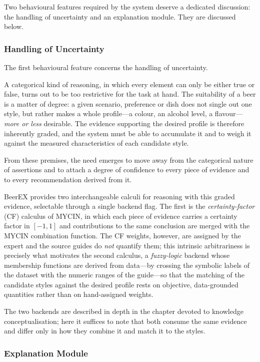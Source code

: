 Two behavioural features required by the system deserve a dedicated discussion:
the handling of uncertainty and an explanation module. They are discussed below.


\subsubsection{Handling of Uncertainty}

The first behavioural feature concerns the handling of uncertainty.

A categorical kind of reasoning, in which every element can only be either true
or false, turns out to be too restrictive for the task at hand. The suitability
of a beer is a matter of degree: a given scenario, preference or dish does not
single out one style, but rather makes a whole profile---a colour, an alcohol
level, a flavour---\emph{more or less} desirable. The evidence supporting the
desired profile is therefore inherently graded, and the system must be able to
accumulate it and to weigh it against the measured characteristics of each
candidate style.

From these premises, the need emerges to move away from the categorical nature of
assertions and to attach a degree of confidence to every piece of evidence and to
every recommendation derived from it.

BeerEX provides two interchangeable calculi for reasoning with this graded
evidence, selectable through a single backend flag. The first is the
\emph{certainty-factor} (CF) calculus of MYCIN, in which each piece of evidence
carries a certainty factor in $[-1,1]$ and contributions to the same conclusion
are merged with the MYCIN combination function. The CF weights, however, are
assigned by the expert and the source guides do \emph{not} quantify them; this
intrinsic arbitrariness is precisely what motivates the second calculus, a
\emph{fuzzy-logic} backend whose membership functions are derived from data---by
crossing the symbolic labels of the dataset with the numeric ranges of the
guide---so that the matching of the candidate styles against the desired profile
rests on objective, data-grounded quantities rather than on hand-assigned
weights.

The two backends are described in depth in the chapter devoted to knowledge
conceptualisation; here it suffices to note that both consume the same evidence
and differ only in how they combine it and match it to the styles.


\subsubsection{Explanation Module}

